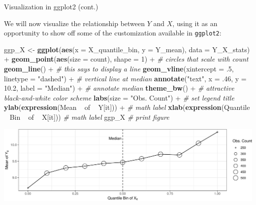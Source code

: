 \documentclass[10pt,ignorenonframetext,]{beamer}
\newenvironment{Shaded}{\begin{snugshade}}{\end{snugshade}}
\newcommand{\KeywordTok}[1]{\textcolor[rgb]{0.13,0.29,0.53}{\textbf{{#1}}}}
\newcommand{\DataTypeTok}[1]{\textcolor[rgb]{0.13,0.29,0.53}{{#1}}}
\newcommand{\DecValTok}[1]{\textcolor[rgb]{0.00,0.00,0.81}{{#1}}}
\newcommand{\FloatTok}[1]{\textcolor[rgb]{0.00,0.00,0.81}{{#1}}}
\newcommand{\StringTok}[1]{\textcolor[rgb]{0.31,0.60,0.02}{{#1}}}
\newcommand{\CommentTok}[1]{\textcolor[rgb]{0.56,0.35,0.01}{\textit{{#1}}}}
\newcommand{\NormalTok}[1]{{#1}}
\begin{document}
\begin{frame}[fragile]{Visualization in ggplot2 (cont.)}

We will now visualize the relationship between \(Y\) and \(X\), using it
as an opportunity to show off some of the customization available in
\texttt{ggplot2}:

\footnotesize

\begin{Shaded}
\begin{Highlighting}[]
\NormalTok{ggp_X <-}\StringTok{ }\KeywordTok{ggplot}\NormalTok{(}\KeywordTok{aes}\NormalTok{(}\DataTypeTok{x =} \NormalTok{X_quantile_bin, }\DataTypeTok{y =} \NormalTok{Y_mean), }\DataTypeTok{data =} \NormalTok{Y_X_stats) +}
\StringTok{  }\KeywordTok{geom_point}\NormalTok{(}\KeywordTok{aes}\NormalTok{(}\DataTypeTok{size =} \NormalTok{count), }\DataTypeTok{shape =} \DecValTok{1}\NormalTok{) +}\StringTok{ }\CommentTok{# circles that scale with count}
\StringTok{  }\KeywordTok{geom_line}\NormalTok{() +}\StringTok{ }\CommentTok{# this says to display a line}
\StringTok{  }\KeywordTok{geom_vline}\NormalTok{(}\DataTypeTok{xintercept =} \NormalTok{.}\DecValTok{5}\NormalTok{, }\DataTypeTok{linetype =} \StringTok{"dashed"}\NormalTok{) +}\StringTok{ }\CommentTok{# vertical line at median}
\StringTok{  }\KeywordTok{annotate}\NormalTok{(}\StringTok{"text"}\NormalTok{, }\DataTypeTok{x =} \NormalTok{.}\DecValTok{46}\NormalTok{, }\DataTypeTok{y =} \FloatTok{10.2}\NormalTok{, }\DataTypeTok{label =} \StringTok{"Median"}\NormalTok{) +}\StringTok{ }\CommentTok{# annotate median}
\StringTok{  }\KeywordTok{theme_bw}\NormalTok{() +}\StringTok{ }\CommentTok{# attractive black-and-white color scheme}
\StringTok{  }\KeywordTok{labs}\NormalTok{(}\DataTypeTok{size =} \StringTok{"Obs. Count"}\NormalTok{) +}\StringTok{ }\CommentTok{# set legend title}
\StringTok{  }\KeywordTok{ylab}\NormalTok{(}\KeywordTok{expression}\NormalTok{(Mean ~}\StringTok{ }\NormalTok{of ~}\StringTok{ }\NormalTok{Y[it])) +}\StringTok{ }\CommentTok{# math label}
\StringTok{  }\KeywordTok{xlab}\NormalTok{(}\KeywordTok{expression}\NormalTok{(Quantile ~}\StringTok{ }\NormalTok{Bin ~}\StringTok{ }\NormalTok{of ~}\StringTok{ }\NormalTok{X[it])) }\CommentTok{# math label}
\NormalTok{ggp_X }\CommentTok{# print figure}
\end{Highlighting}
\end{Shaded}

\includegraphics{r-tutorial_files/figure-beamer/unnamed-chunk-13-1.pdf}

\normalsize

\end{frame}
\end{document}
